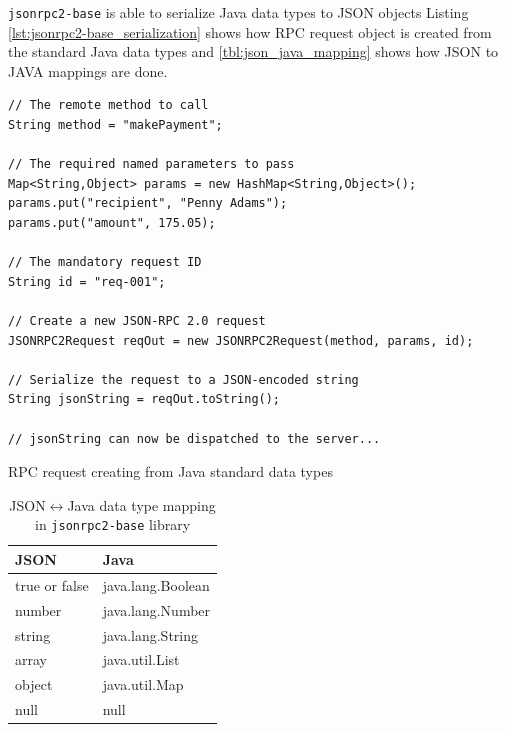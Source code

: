 \texttt{jsonrpc2-base} is able to serialize Java data types to JSON objects
Listing \ref{lst:jsonrpc2-base_serialization} shows how RPC request object is
created from the standard Java data types and \autoref{tbl:json_java_mapping}
shows how JSON to JAVA mappings are done.

\begin{listing}[H]
\begin{verbatim}
// The remote method to call
String method = "makePayment";

// The required named parameters to pass
Map<String,Object> params = new HashMap<String,Object>();
params.put("recipient", "Penny Adams");
params.put("amount", 175.05);

// The mandatory request ID
String id = "req-001";

// Create a new JSON-RPC 2.0 request
JSONRPC2Request reqOut = new JSONRPC2Request(method, params, id);

// Serialize the request to a JSON-encoded string
String jsonString = reqOut.toString();

// jsonString can now be dispatched to the server...
\end{verbatim}
\caption{RPC request creating from Java standard data types \cite{jsonrpc2-base}}
\label{lst:jsonrpc2-base_serialization}
\end{listing}


\begin{table}[h]
	\centering	
	\begin{tabularx}{0.5\textwidth}{|X|X|}
		\hline
		\textbf{JSON} &
		\textbf{Java} 		
	    \tabularnewline
		\hline
		true or false 
		&
		java.lang.Boolean
		
	    \tabularnewline
		\hline
		number 
		&
		java.lang.Number
		
	    \tabularnewline
		\hline
		string 
		&
		java.lang.String
		
		\tabularnewline
		\hline
		array 
		&
		java.util.List
		
		\tabularnewline
		\hline
		object 
		&
		java.util.Map
		
		\tabularnewline
		\hline
		null 
		&
		null	
		
		\tabularnewline
		\hline	  
	\end{tabularx} 
	\caption{{JSON}\(\leftrightarrow\){Java} data type mapping in
	\texttt{jsonrpc2-base} library \cite{jsonrpc2-base}}
	\label{tbl:json_java_mapping}
\end{table}

